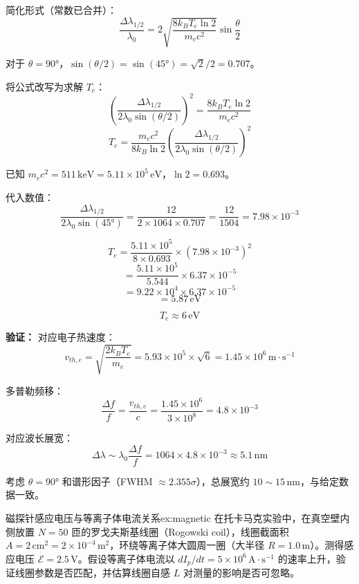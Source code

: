 简化形式（常数已合并）：
\[
    \frac{\Delta\lambda_{1/2}}{\lambda_0} = 2\sqrt{\frac{8k_B T_e \ln 2}{m_e c^2}} \sin\frac{\theta}{2}
\]

对于 $\theta = 90°$，$\sin(\theta/2) = \sin(45°) = \sqrt{2}/2 = 0.707$。

将公式改写为求解 $T_e$：
\[
    \left(\frac{\Delta\lambda_{1/2}}{2\lambda_0 \sin(\theta/2)}\right)^2 = \frac{8k_B T_e \ln 2}{m_e c^2}
\]
\begin{equation}
    T_e = \frac{m_e c^2}{8k_B \ln 2} \left(\frac{\Delta\lambda_{1/2}}{2\lambda_0 \sin(\theta/2)}\right)^2
\label{eq:ch12-thomson-temperature}
\end{equation}

已知 $m_e c^2 = 511\,\mathrm{keV} = 5.11\times10^5\,\mathrm{eV}$，$\ln 2 = 0.693$。

代入数值：
\[
    \frac{\Delta\lambda_{1/2}}{2\lambda_0 \sin(45°)} = \frac{12}{2\times1064\times0.707} = \frac{12}{1504} = 7.98\times10^{-3}
\]

\[
    T_e = \frac{5.11\times10^5}{8\times0.693} \times (7.98\times10^{-3})^2
\]
\[
    = \frac{5.11\times10^5}{5.544} \times 6.37\times10^{-5}
\]
\[
    = 9.22\times10^4 \times 6.37\times10^{-5}
\]
\[
    = 5.87\,\mathrm{eV}
\]

\[
    \boxed{T_e \approx 6\,\mathrm{eV}}
\]

\textbf{验证：} 对应电子热速度：
\[
    v_{th,e} = \sqrt{\frac{2k_B T_e}{m_e}} = 5.93\times10^5\times\sqrt{6} = 1.45\times10^6\,\mathrm{m\cdot s^{-1}}
\]

多普勒频移：
\[
    \frac{\Delta f}{f} = \frac{v_{th,e}}{c} = \frac{1.45\times10^6}{3\times10^8} = 4.8\times10^{-3}
\]

对应波长展宽：
\[
    \Delta\lambda \sim \lambda_0 \frac{\Delta f}{f} = 1064\times 4.8\times10^{-3} \approx 5.1\,\mathrm{nm}
\]

考虑 $\theta = 90°$ 和谱形因子（FWHM $\approx 2.355\sigma$），总展宽约 $10\sim15\,\mathrm{nm}$，与给定数据一致。


\begin{example}{磁探针感应电压与等离子体电流关系}{ex:magnetic}
在托卡马克实验中，在真空壁内侧放置 $N=50$ 匝的罗戈夫斯基线圈（Rogowski coil），线圈截面积 $A = 2\,\mathrm{cm^2} = 2\times10^{-4}\,\mathrm{m^2}$，环绕等离子体大圆周一圈（大半径 $R=1.0\,\mathrm{m}$）。测得感应电压 $\mathcal{E} = 2.5\,\mathrm{V}$。假设等离子体电流以 $dI_p/dt = 5\times10^6\,\mathrm{A\cdot s^{-1}}$ 的速率上升，验证线圈参数是否匹配，并估算线圈自感 $L$ 对测量的影响是否可忽略。
\end{example}

